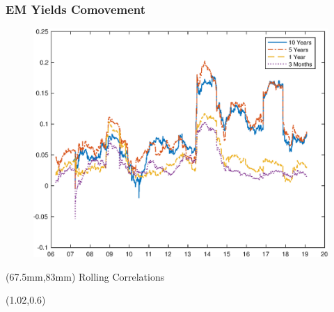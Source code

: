 \documentclass[12pt, aspectratio=169, xcolor=dvipsnames]{beamer}
\begin{document}

\begin{frame}[label=RollingCorr]
\frametitle{EM Yields Comovement}
\begin{figure}[!htbp]
	\begin{center} %
		\includegraphics[trim={0cm 0cm 0cm 0cm},clip,height=0.8\textheight,width=0.85\linewidth]{../Figures/Estimation/rolling_dn_data.eps}
		\par\end{center}
\end{figure}
\begin{textblock*}{10cm}(67.5mm,83mm)
	\footnotesize Rolling Correlations
\end{textblock*}
\begin{textblock*}{5cm}(1.02\textwidth,0.6\textheight)
	\hyperlink{DYindex}{}
\end{textblock*}
\end{frame}
\end{document}
